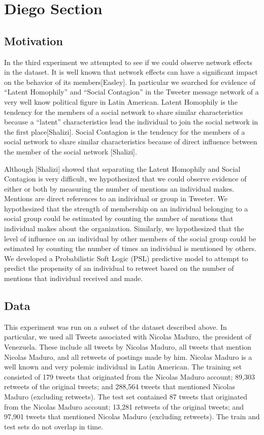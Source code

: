 \section{Diego Section}
\subsection{Motivation}
In the third experiment we attempted to see if we could observe network effects in the dataset. It is well known that network effects can have a significant impact on the behavior of its members[Easley].  In particular we searched for evidence of “Latent Homophily” and “Social Contagion” in the Tweeter message network of a very well know political figure in Latin American.  Latent Homophily is the tendency for the members of a social network to share similar characteristics because a “latent” characteristics lead the individual to join the social network in the first place[Shalizi].  Social Contagion is the tendency for the members of a social network to share similar characteristics because of direct influence between the member of the social network [Shalizi].

Although [Shalizi] showed that separating the Latent Homophily and Social Contagion is very difficult, we hypothesized that we could observe evidence of either or both by measuring the number of mentions an individual makes.  Mentions are direct references to an individual or group in Tweeter.  We hypothesized that the strength of membership on an individual belonging to a social group could be estimated by counting the number of mentions that individual makes about the organization.  Similarly, we hypothesized that the level of influence on an individual by other members of the social group could be estimated by counting the number of times an individual is mentioned by others.  We developed a Probabilistic Soft Logic (PSL) predictive model to attempt to predict the propensity of an individual to retweet based on the number of mentions that individual received and made.

\subsection{Data}
This experiment was run on a subset of the dataset described above.  In particular, we used all Tweets associated with Nicolas Maduro, the president of Venezuela.  These include all tweets by Nicolas Maduro, all tweets that mention Nicolas Maduro, and all retweets of postings made by him.  Nicolas Maduro is a well known and very polemic individual in Latin American.  The training set consisted of 179 tweets that originated from the Nicolas Maduro account; 89,303 retweets of the original tweets; and 288,564 tweets that mentioned Nicolas Maduro (excluding retweets).  The test set contained 87 tweets that originated from the Nicolas Maduro account;  13,281 retweets of the original tweets; and 97,901 tweets that mentioned Nicolas Maduro (excluding retweets).  The train and test sets do not overlap in time.

